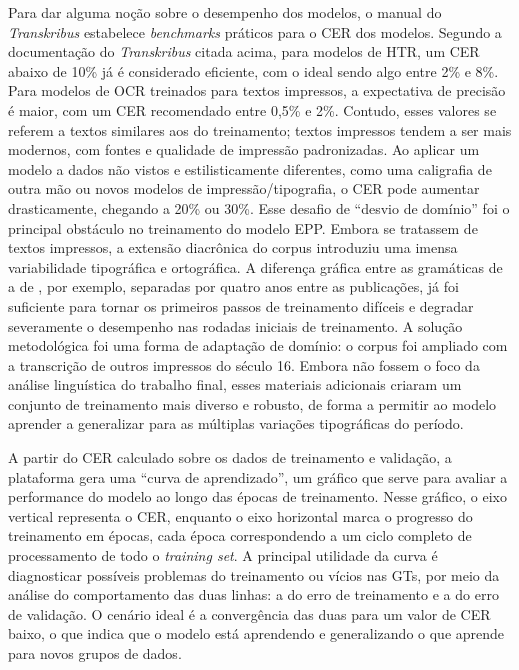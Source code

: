 \documentclass[portuguese]{textolivre}
\begin{document}
Para dar alguma noção sobre o desempenho dos modelos, o manual do \textit{Transkribus} estabelece \textit{benchmarks }práticos para o CER dos modelos. Segundo a documentação do \textit{Transkribus }citada acima, para modelos de HTR, um CER abaixo de 10\% já é considerado eficiente, com o ideal sendo algo entre 2\% e 8\%. Para modelos de OCR treinados para textos impressos, a expectativa de precisão é maior, com um CER recomendado entre 0,5\% e 2\%. Contudo, esses valores se referem a textos similares aos do treinamento; textos impressos tendem a ser mais modernos, com fontes e qualidade de impressão padronizadas. Ao aplicar um modelo a dados não vistos e estilisticamente diferentes, como uma caligrafia de outra mão ou novos modelos de impressão/tipografia, o CER pode aumentar drasticamente, chegando a 20\% ou 30\%. Esse desafio de “desvio de domínio” foi o principal obstáculo no treinamento do modelo EPP. Embora se tratassem de textos impressos, a extensão diacrônica do corpus introduziu uma imensa variabilidade tipográfica e ortográfica. A diferença gráfica entre as gramáticas de \textcite{oliveira1536grammatica} a de \textcite{barros1540grammatica}, por exemplo, separadas por quatro anos entre as publicações, já foi suficiente para tornar os primeiros passos de treinamento difíceis e degradar severamente o desempenho nas rodadas iniciais de treinamento. A solução metodológica foi uma forma de adaptação de domínio: o corpus foi ampliado com a transcrição de outros impressos do século 16. Embora não fossem o foco da análise linguística do trabalho final, esses materiais adicionais criaram um conjunto de treinamento mais diverso e robusto, de forma a permitir ao modelo aprender a generalizar para as múltiplas variações tipográficas do período.

A partir do CER calculado sobre os dados de treinamento e validação, a plataforma gera uma “curva de aprendizado”, um gráfico que serve para avaliar a performance do modelo ao longo das épocas de treinamento. Nesse gráfico, o eixo vertical representa o CER, enquanto o eixo horizontal marca o progresso do treinamento em épocas, cada época correspondendo a um ciclo completo de processamento de todo o \textit{training set}. A principal utilidade da curva é diagnosticar possíveis problemas do treinamento ou vícios nas GTs, por meio da análise do comportamento das duas linhas: a do erro de treinamento e a do erro de validação. O cenário ideal é a convergência das duas para um valor de CER baixo, o que indica que o modelo está aprendendo e generalizando o que aprende para novos grupos de dados.
\end{document}
